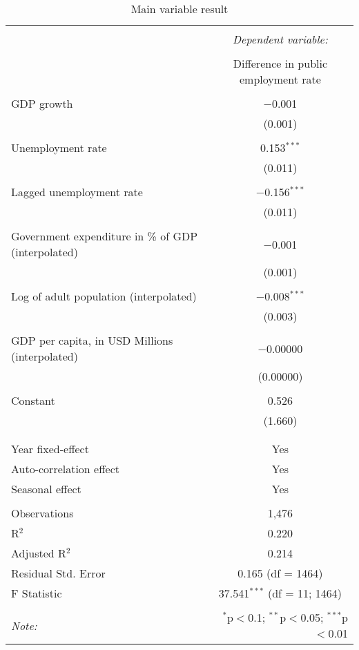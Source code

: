 
\begin{table}[!htbp] \centering 
  \caption{Main variable result} 
  \label{} 
\begin{tabular}{@{\extracolsep{5pt}}lc} 
\\[-1.8ex]\hline 
\hline \\[-1.8ex] 
 & \multicolumn{1}{c}{\textit{Dependent variable:}} \\ 
\cline{2-2} 
\\[-1.8ex] & Difference in public employment rate \\ 
\hline \\[-1.8ex] 
 GDP growth & $-$0.001 \\ 
  & (0.001) \\ 
  & \\ 
 Unemployment rate & 0.153$^{***}$ \\ 
  & (0.011) \\ 
  & \\ 
 Lagged unemployment rate & $-$0.156$^{***}$ \\ 
  & (0.011) \\ 
  & \\ 
 Government expenditure in \% of GDP (interpolated) & $-$0.001 \\ 
  & (0.001) \\ 
  & \\ 
 Log of adult population (interpolated) & $-$0.008$^{***}$ \\ 
  & (0.003) \\ 
  & \\ 
 GDP per capita, in USD Millions (interpolated) & $-$0.00000 \\ 
  & (0.00000) \\ 
  & \\ 
 Constant & 0.526 \\ 
  & (1.660) \\ 
  & \\ 
\hline \\[-1.8ex] 
Year fixed-effect & Yes \\ 
Auto-correlation effect & Yes \\ 
Seasonal effect & Yes \\ 
\hline \\[-1.8ex] 
Observations & 1,476 \\ 
R$^{2}$ & 0.220 \\ 
Adjusted R$^{2}$ & 0.214 \\ 
Residual Std. Error & 0.165 (df = 1464) \\ 
F Statistic & 37.541$^{***}$ (df = 11; 1464) \\ 
\hline 
\hline \\[-1.8ex] 
\textit{Note:}  & \multicolumn{1}{r}{$^{*}$p$<$0.1; $^{**}$p$<$0.05; $^{***}$p$<$0.01} \\ 
\end{tabular} 
\end{table} 
